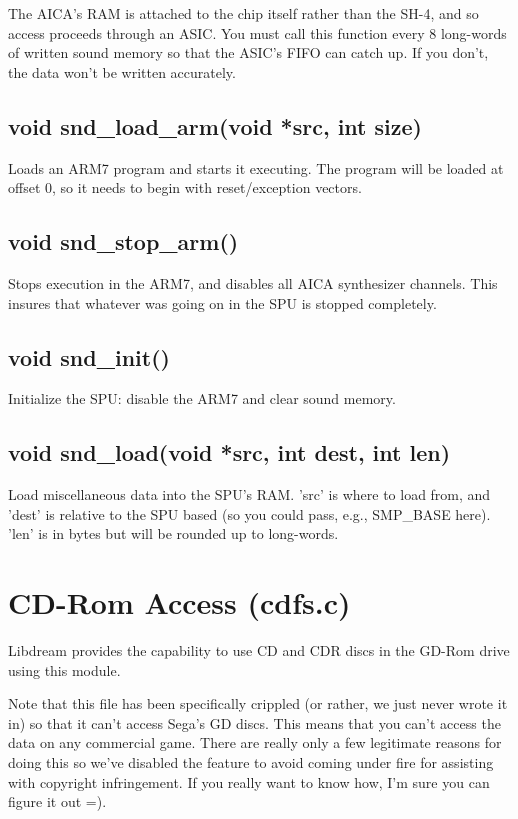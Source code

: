 \documentclass[english]{report}
\begin{document}
The AICA's RAM is attached to the chip itself rather than the SH-4,
and so access proceeds through an ASIC. You must call this function
every 8 long-words of written sound memory so that the ASIC's FIFO
can catch up. If you don't, the data won't be written accurately.


\subsection{void snd\_load\_arm(void *src, int size)}

Loads an ARM7 program and starts it executing. The program will be
loaded at offset 0, so it needs to begin with reset/exception vectors.


\subsection{void snd\_stop\_arm()}

Stops execution in the ARM7, and disables all AICA synthesizer channels.
This insures that whatever was going on in the SPU is stopped completely.


\subsection{void snd\_init()}

Initialize the SPU: disable the ARM7 and clear sound memory.


\subsection{void snd\_load(void *src, int dest, int len)}

Load miscellaneous data into the SPU's RAM. 'src' is where to load
from, and 'dest' is relative to the SPU based (so you could pass,
e.g., SMP\_BASE here). 'len' is in bytes but will be rounded up to
long-words.


\section{CD-Rom Access (cdfs.c)}

Libdream provides the capability to use CD and CDR discs in the GD-Rom
drive using this module.

Note that this file has been specifically crippled (or rather, we
just never wrote it in) so that it can't access Sega's GD discs. This
means that you can't access the data on any commercial game. There
are really only a few legitimate reasons for doing this so we've disabled
the feature to avoid coming under fire for assisting with copyright
infringement. If you really want to know how, I'm sure you can figure
it out =).
\end{document}
